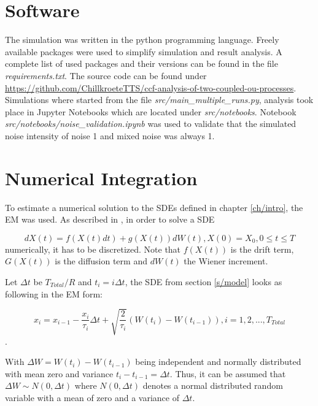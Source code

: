 \documentclass[a4paper,12pt]{book}
\theoremstyle{break}
\begin{document}
\section{Software}
The simulation was written in the python programming language. Freely available packages were used to simplify simulation and result analysis. A complete list of used packages and their versions can be found in the file \emph{requirements.txt}. The source code can be found under \hyperlink{https://github.com/ChillkroeteTTS/ccf-analysis-of-two-coupled-ou-processes}{https://github.com/ChillkroeteTTS/ccf-analysis-of-two-coupled-ou-processes}.
Simulations where started from the file \emph{src/main\_multiple\_runs.py}, analysis took place in Jupyter Notebooks which are located under \emph{src/notebooks}. Notebook \emph{src/notebooks/noise\_validation.ipynb} was used to validate that the simulated noise intensity of noise 1 and mixed noise was always 1.

\section{Numerical Integration}\label{s/meth/num}
To estimate a numerical solution to the \ac{SDE}s defined in chapter \ref{ch/intro}, the \ac{EM} was used.
As described in \cite{numSim}, in order to solve a \ac{SDE}

\begin{equation}\label{eq/meth/num/sde}
	dX(t) = f(X(t)dt) + g(X(t))dW(t), X(0)=X_0, 0 \le t \le T
\end{equation} numerically, it has to be discretized.
Note that $f(X(t))$ is the drift term, $G(X(t))$ is the diffusion term and $dW(t)$ the  Wiener increment.

Let $\Delta t$ be $T_{Total}/R$ and $t_i = i\Delta t$, the \ac{SDE} from section \ref{s/model} looks as following in the \ac{EM} form:


\begin{equation}\label{eq/meth/num/discSde}
	x_i = x_{i-1} -\frac{x_i}{\tau_i} \Delta t + \sqrt{\frac{2}{\tau_i}} (W(t_i)  - W(t_{i-1})), i=1,2,..., T_{Total}
\end{equation}.

With $\Delta W = W(t_i)  - W(t_{i-1})$ being independent and normally distributed with mean zero and variance $t_i - t_{i-1} = \Delta t$. Thus, it can be assumed that $\Delta W \sim N(0, \Delta t)$ where $N(0, \Delta t)$ denotes a normal distributed random variable with a mean  of zero and a variance of $\Delta t$. 
\end{document}
